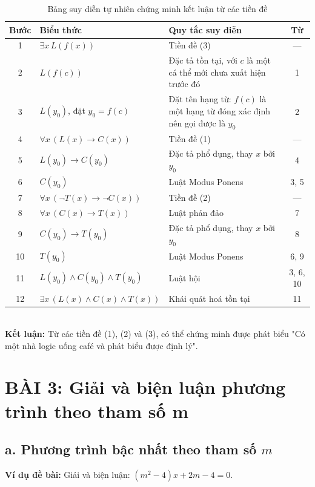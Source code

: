 \documentclass[12pt,a4paper]{article}
\begin{document}
\begin{table}[h!]
\centering
\begin{tabular}{|c|l|p{6.6cm}|c|}
\hline
\textbf{Bước} & \textbf{Biểu thức} & \textbf{Quy tắc suy diễn} & \textbf{Từ} \\
\hline
1 & $\exists x \, L(f(x))$                          & Tiền đề (3) & --- \\
2 & $L(f(c))$                                       & Đặc tả tồn tại, với $c$ là một cá thể mới chưa xuất hiện trước đó & 1 \\
3 & $L(y_0)$, đặt $y_0 = f(c)$                      & Đặt tên hạng từ: $f(c)$ là một hạng từ đóng xác định nên gọi được là $y_0$ & 2 \\
4 & $\forall x \, (L(x) \to C(x))$                  & Tiền đề (1) & --- \\
5 & $L(y_0) \to C(y_0)$                             & Đặc tả phổ dụng, thay $x$ bởi $y_0$ & 4 \\
6 & $C(y_0)$                                        & Luật Modus Ponens & 3, 5 \\
7 & $\forall x \, (\neg T(x) \to \neg C(x))$        & Tiền đề (2) & --- \\
8 & $\forall x \, (C(x) \to T(x))$                  & Luật phản đảo & 7 \\
9 & $C(y_0) \to T(y_0)$                             & Đặc tả phổ dụng, thay $x$ bởi $y_0$ & 8 \\
10 & $T(y_0)$                                       & Luật Modus Ponens & 6, 9 \\
11 & $L(y_0) \land C(y_0) \land T(y_0)$             & Luật hội & 3, 6, 10 \\
12 & $\exists x \, (L(x) \land C(x) \land T(x))$    & Khái quát hoá tồn tại & 11 \\
\hline
\end{tabular}
\caption{Bảng suy diễn tự nhiên chứng minh kết luận từ các tiền đề}
\end{table}\\
\textbf{Kết luận:} Từ các tiền đề (1), (2) và (3), có thể chứng minh được phát biểu "Có một nhà logic uống café và phát biểu được định lý".

\newpage
\section{BÀI 3: Giải và biện luận phương trình theo tham số m}

\subsection{a. Phương trình bậc nhất theo tham số $m$}
\textbf{Ví dụ đề bài:} Giải và biện luận: $(m^2 - 4)x + 2m - 4 = 0$.
\end{document}

